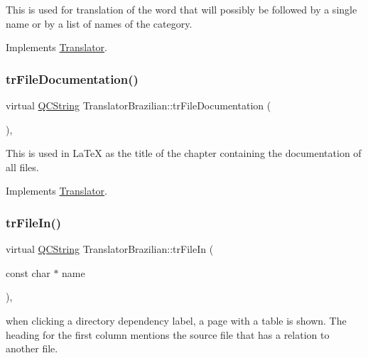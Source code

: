 This is used for translation of the word that will possibly be followed by a single name or by a list of names of the category. 

Implements \mbox{\hyperlink{class_translator}{Translator}}.

\mbox{\label{class_translator_brazilian_a60883bd65e7cb2b2de3fe567d7fac162}} 
\subsubsection{\texorpdfstring{trFileDocumentation()}{trFileDocumentation()}}
{\footnotesize\ttfamily virtual \mbox{\hyperlink{class_q_c_string}{Q\+C\+String}} Translator\+Brazilian\+::tr\+File\+Documentation (\begin{DoxyParamCaption}{ }\end{DoxyParamCaption})\hspace{0.3cm}{\ttfamily [inline]}, {\ttfamily [virtual]}}

This is used in La\+TeX as the title of the chapter containing the documentation of all files. 

Implements \mbox{\hyperlink{class_translator}{Translator}}.

\mbox{\label{class_translator_brazilian_a6aa35829279a440a63ffc4c546a92c3b}} 
\subsubsection{\texorpdfstring{trFileIn()}{trFileIn()}}
{\footnotesize\ttfamily virtual \mbox{\hyperlink{class_q_c_string}{Q\+C\+String}} Translator\+Brazilian\+::tr\+File\+In (\begin{DoxyParamCaption}\item[{const char $\ast$}]{name }\end{DoxyParamCaption})\hspace{0.3cm}{\ttfamily [inline]}, {\ttfamily [virtual]}}

when clicking a directory dependency label, a page with a table is shown. The heading for the first column mentions the source file that has a relation to another file. 

